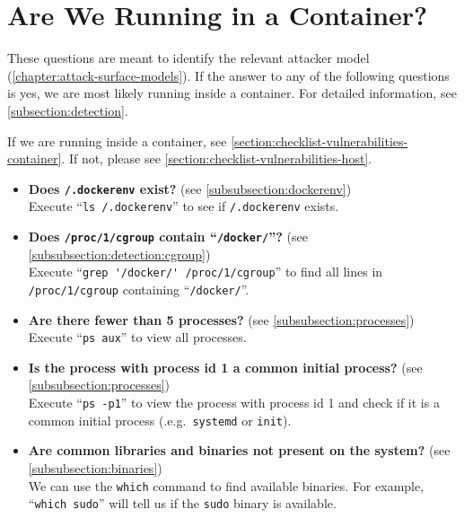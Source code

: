 \section{Are We Running in a Container?}\label{section:checklist-detection}
These questions are meant to identify the relevant attacker model (\autoref{chapter:attack-surface-models}). If the answer to any of the following questions is yes, we are most likely running inside a container. For detailed information, see \autoref{subsection:detection}.

\medskip

If we are running inside a container, see \autoref{section:checklist-vulnerabilities-container}. If not, please see \autoref{section:checklist-vulnerabilities-host}.

\begin{itemize}
    \item \textbf{Does \lstinline{/.dockerenv} exist?} (see \autoref{subsubsection:dockerenv})\\
    Execute ``\lstinline{ls /.dockerenv}'' to see if \lstinline{/.dockerenv} exists.

    \item \textbf{Does \lstinline{/proc/1/cgroup} contain ``\lstinline{/docker/}''?} (see \autoref{subsubsection:detection:cgroup})\\
    Execute ``\lstinline{grep '/docker/' /proc/1/cgroup}'' to find all lines in \lstinline{/proc/1/cgroup} containing ``\lstinline{/docker/}''.

    \item \textbf{Are there fewer than 5 processes?} (see \autoref{subsubsection:processes})\\
    Execute ``\lstinline{ps aux}'' to view all processes.

    \item \textbf{Is the process with process id 1 a common initial process?} (see \autoref{subsubsection:processes})\\
    Execute ``\lstinline{ps -p1}'' to view the process with process id 1 and check if it is a common initial process (.e.g.\ \lstinline{systemd} or \lstinline{init}).

    \item \textbf{Are common libraries and binaries not present on the system?} (see \autoref{subsubsection:binaries})\\
    We can use the \lstinline{which} command to find available binaries. For example, ``\lstinline{which sudo}'' will tell us if the \lstinline{sudo} binary is available.
\end{itemize}
